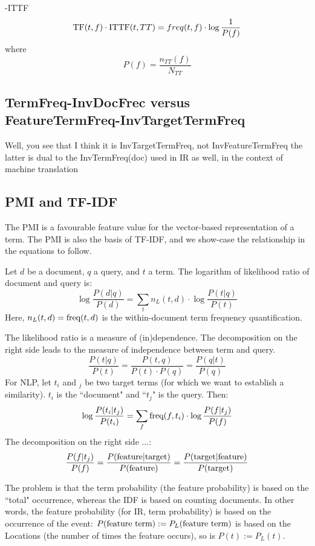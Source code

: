 \begin{definition}
\TF-\textmd{ITTF}
\begin{equation}
\label{tf-ittf}
\textmd{TF}(t,f) \cdot \textmd{ITTF}(t, TT) = freq(t, f) \cdot \log{\frac{1}{P(f)}}
\end{equation}
where
\[
P(f) =  \frac{n_{TT}(f)}{N_{TT}}
\]
\end{definition}


\subsection{TermFreq-InvDocFrec versus FeatureTermFreq-InvTargetTermFreq}

Well, you see that I think it is InvTargetTermFreq, not InvFeatureTermFreq
the latter is dual to the InvTermFreq(doc)
used in IR as well, in the context of machine translation



\subsection{PMI and TF-IDF}

The PMI is a favourable feature value for the vector-based representation
of a term.
The PMI is also the basis of TF-IDF, and we show-case the relationship
in the equations to follow.

Let $d$ be a document, $q$ a query, and $t$ a term.
The logarithm of likelihood ratio of document and query is:
\[
\log\frac{P(d|q)}{P(d)} =
	\sum_t n_L(t,d) \cdot \log\frac{P(t|q)}{P(t)}
\]
Here, $n_L(t,d)=\textmd{freq}(t,d)$ is the within-document term frequency
quantification.

The likelihood ratio is a measure of (in)dependence.
The decomposition on the right side leads to the measure of independence
between term and query.
\[
\frac{P(t|q)}{P(t)} = \frac{P(t,q)}{P(t) \cdot P(q)} = \frac{P(q|t)}{P(q)}
\]
For NLP, let $t_i$ and $_j$ be two target terms
(for which we want to establish a similarity).
$t_i$ is the ``document" and ``$t_j$" is the query.
Then:
\[
\log\frac{P(t_i|t_j)}{P(t_i)} =
	\sum_f \textmd{freq}(f,t_i) \cdot \log\frac{P(f|t_j)}{P(f)}
\]
The decomposition on the right side ...:
\[
\frac{P(f|t_j)}{P(f)} =
\frac{P(\textmd{feature}|\textmd{target})}{P(\textmd{feature})} =
\frac{P(\textmd{target}|\textmd{feature})}{P(\textmd{target})}
\]

The problem is that the term probability (the feature probability)
is based on the ``total" occurrence, whereas the IDF is based
on counting documents.
In other words,
the feature probability (for IR, term probability) is based on
the occurrence of the event:
$P(\textmd{feature term}):=P_L(\textmd{feature term})$
is based on the Locations (the number of times the feature occurs), so is
$P(t):=P_L(t)$.

